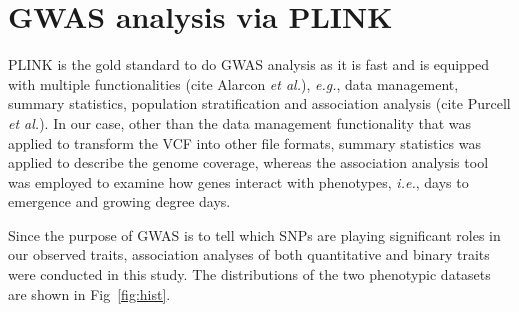 \documentclass{article}
\begin{document}
\section*{GWAS analysis via PLINK}
PLINK is the gold standard to do GWAS analysis as it is fast and is equipped with multiple functionalities (cite Alarcon \emph{et al.}), \emph{e.g.}, data management, summary statistics, population stratification and association analysis (cite Purcell \emph{et al.}). In our case, other than the data management functionality that was applied to transform the VCF into other file formats,  summary statistics was applied to describe the genome coverage, whereas the association analysis tool was employed to examine how genes interact with phenotypes, \emph{i.e.}, days to emergence and growing degree days. 

Since the purpose of GWAS is to tell which SNPs are playing significant roles in our observed traits, association analyses of both quantitative and binary traits were conducted in this study. The distributions of the two phenotypic datasets are shown in Fig~\ref{fig:hist}.
\end{document}
